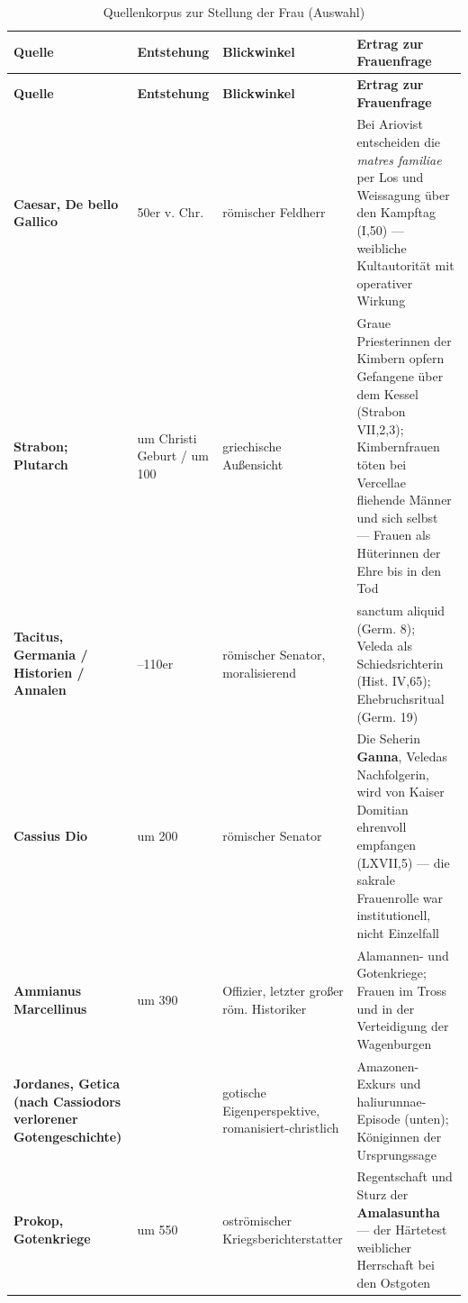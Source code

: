 \documentclass[11pt,a4paper,ngerman]{scrartcl}
\begin{document}
\begin{small}
\begin{longtable}{>{\raggedright\arraybackslash}p{}>{\raggedright\arraybackslash}p{}>{\raggedright\arraybackslash}p{}>{\raggedright\arraybackslash}p{}}
\caption{Quellenkorpus zur Stellung der Frau (Auswahl)}\\
\toprule
\textbf{Quelle} & \textbf{Entstehung} & \textbf{Blickwinkel} & \textbf{Ertrag zur Frauenfrage} \\
\midrule
\endfirsthead
\toprule
\textbf{Quelle} & \textbf{Entstehung} & \textbf{Blickwinkel} & \textbf{Ertrag zur Frauenfrage} \\
\midrule
\endhead
\textbf{Caesar, De bello Gallico} & 50er v. Chr. & römischer Feldherr & Bei Ariovist entscheiden die \emph{matres familiae} per Los und Weissagung über den Kampftag (I,50) — weibliche Kultautorität mit operativer Wirkung \\
\addlinespace[2pt]
\textbf{Strabon; Plutarch} & um Christi Geburt / um 100 & griechische Außensicht & Graue Priesterinnen der Kimbern opfern Gefangene über dem Kessel (Strabon VII,2,3); Kimbernfrauen töten bei Vercellae fliehende Männer und sich selbst — Frauen als Hüterinnen der Ehre bis in den Tod \\
\addlinespace[2pt]
\textbf{Tacitus, Germania / Historien / Annalen} & 98–110er & römischer Senator, moralisierend & sanctum aliquid (Germ. 8); Veleda als Schiedsrichterin (Hist. IV,65); Ehebruchsritual (Germ. 19) \\
\addlinespace[2pt]
\textbf{Cassius Dio} & um 200 & römischer Senator & Die Seherin \textbf{Ganna}, Veledas Nachfolgerin, wird von Kaiser Domitian ehrenvoll empfangen (LXVII,5) — die sakrale Frauenrolle war institutionell, nicht Einzelfall \\
\addlinespace[2pt]
\textbf{Ammianus Marcellinus} & um 390 & Offizier, letzter großer röm. Historiker & Alamannen- und Gotenkriege; Frauen im Tross und in der Verteidigung der Wagenburgen \\
\addlinespace[2pt]
\textbf{\textbf{Jordanes, Getica} (nach Cassiodors verlorener Gotengeschichte)} & 551 & gotische Eigenperspektive, romanisiert-christlich & Amazonen-Exkurs und haliurunnae-Episode (unten); Königinnen der Ursprungssage \\
\addlinespace[2pt]
\textbf{\textbf{Prokop, Gotenkriege}} & um 550 & oströmischer Kriegsberichterstatter & Regentschaft und Sturz der \textbf{Amalasuntha} — der Härtetest weiblicher Herrschaft bei den Ostgoten \\

\end{longtable}
\end{small}
\end{document}
